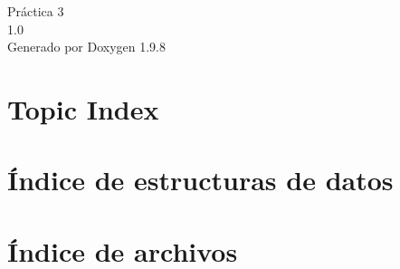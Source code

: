 \documentclass[twoside]{book}
\newcommand{\+}{\discretionary{\mbox{\scriptsize$\hookleftarrow$}}{}{}}
\newcommand{\clearemptydoublepage}{%
    \newpage{\pagestyle{empty}\cleardoublepage}%
  }
\begin{document}
  \raggedbottom
    \hypersetup{pageanchor=false,
                bookmarksnumbered=true,
                pdfencoding=unicode
               }
  \begin{titlepage}
  \vspace*{7cm}
  \begin{center}%
  {\Large Práctica 3}\\
  [1ex]\large 1.\+0 \\
  \vspace*{1cm}
  {\large Generado por Doxygen 1.9.8}\\
  \end{center}
  \end{titlepage}
  \clearemptydoublepage
  \tableofcontents
  \clearemptydoublepage
  \hypersetup{pageanchor=true}



\chapter{Topic Index}

\chapter{Índice de estructuras de datos}

\chapter{Índice de archivos}

\end{document}

